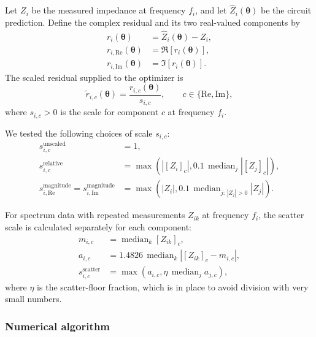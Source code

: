 \documentclass[
    11pt,
    a4paper,
    oneside
]{article}
\begin{document}
Let \(Z_i\) be the measured impedance at frequency \(f_i\), and let
\(\widehat Z_i(\boldsymbol{\theta})\) be the circuit prediction. Define
the complex residual and its two real-valued components by
\begin{align}
r_i(\boldsymbol{\theta})
    &= \widehat Z_i(\boldsymbol{\theta})-Z_i, \\
r_{i,\mathrm{Re}}(\boldsymbol{\theta})
    &= \Re\!\left[r_i(\boldsymbol{\theta})\right], \\
r_{i,\mathrm{Im}}(\boldsymbol{\theta})
    &= \Im\!\left[r_i(\boldsymbol{\theta})\right].
\end{align}
The scaled residual supplied to the optimizer is
\begin{equation}
\widetilde r_{i,c}(\boldsymbol{\theta})
    = \frac{r_{i,c}(\boldsymbol{\theta})}{s_{i,c}},
    \qquad c\in\{\mathrm{Re},\mathrm{Im}\},
\end{equation}
where \(s_{i,c}>0\) is the scale for component \(c\) at frequency \(f_i\).

We tested the following choices of scale \(s_{i,c}\):
\begin{align}
s_{i,c}^{\mathrm{unscaled}}
    &= 1,\\
s_{i,c}^{\mathrm{relative}}
    &= \max\!\left(
        |[Z_i]_c|,
        0.1\,\operatorname{median}_{j}|[Z_j]_c|
       \right),\\
s_{i,\mathrm{Re}}^{\mathrm{magnitude}}
=s_{i,\mathrm{Im}}^{\mathrm{magnitude}}
    &= \max\!\left(
        |Z_i|,
        0.1\,\operatorname{median}_{j:\,|Z_j|>0}|Z_j|
       \right).
\end{align}

For spectrum data with repeated measurements \(Z_{ik}\) at frequency \(f_i\),
the scatter scale is calculated separately for each component:
\begin{align}
m_{i,c}
    &= \operatorname{median}_{k}[Z_{ik}]_c,\\
a_{i,c}
    &= 1.4826\,
       \operatorname{median}_{k}
       \left|[Z_{ik}]_c-m_{i,c}\right|,\\
s_{i,c}^{\mathrm{scatter}}
    &= \max\!\left(
        a_{i,c},
        \eta\,\operatorname{median}_{j}a_{j,c}
       \right),
\end{align}
where \(\eta\) is the scatter-floor fraction, which is in place to avoid division with very small numbers.



\subsubsection{Numerical algorithm}\label{numalg}
\end{document}
